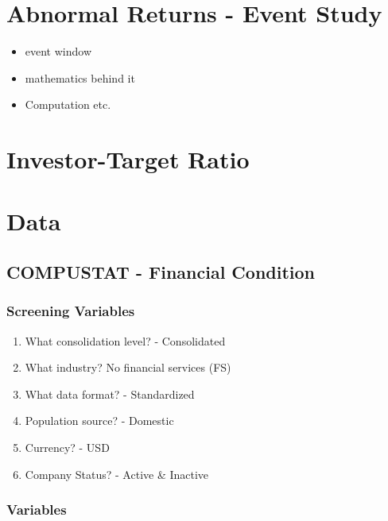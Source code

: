 \documentclass[12pt]{article}
\begin{document}
\section{Abnormal Returns - Event Study} 
    \begin{itemize}
        \item event window
        \item mathematics behind it 
        \item Computation etc.
    \end{itemize}

\section{Investor-Target Ratio}  

\section{Data}

    \subsection{COMPUSTAT - Financial Condition}

        \subsubsection{Screening Variables}

        \begin{enumerate}
            \item What consolidation level? - Consolidated
            \item What industry? No financial services (FS) 
            \item What data format?  - Standardized 
            \item Population source? - Domestic 
            \item Currency? - USD 
            \item Company Status? - Active \& Inactive  
        \end{enumerate}

        \subsubsection{Variables}
\end{document}
